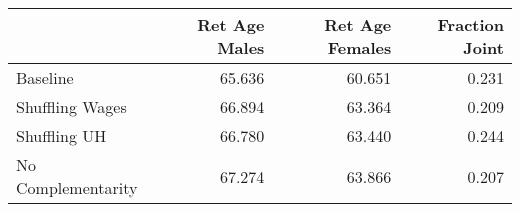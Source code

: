 \begin{tabular}{lrrr}
\toprule
{} & Ret Age Males & Ret Age Females & Fraction Joint \\
\midrule
Baseline           &        65.636 &          60.651 &          0.231 \\
Shuffling Wages    &        66.894 &          63.364 &          0.209 \\
Shuffling UH       &        66.780 &          63.440 &          0.244 \\
No Complementarity &        67.274 &          63.866 &          0.207 \\
\bottomrule
\end{tabular}
